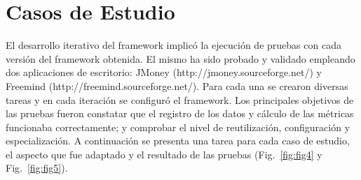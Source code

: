 \section{Casos de Estudio}
\label{sec:casos_de_estudio}
 
 El desarrollo iterativo del framework implicó la ejecución de pruebas con cada versión del framework obtenida. El mismo ha sido probado y validado empleando dos aplicaciones de escritorio: JMoney (http://jmoney.sourceforge.net/) y Freemind (http://freemind.sourceforge.net/). 
%
%
%
%
Para cada una se crearon diversas tareas y en cada iteración se configuró el framework. Los principales objetivos de las pruebas fueron constatar que el registro de los datos y cálculo de las métricas funcionaba correctamente; y comprobar el nivel de reutilización, configuración y especialización. A continuación se presenta una tarea para cada caso de estudio, el aspecto que fue adaptado  y el resultado de las pruebas (Fig.~\ref{fig:fig4} y Fig.~\ref{fig:fig5}).

